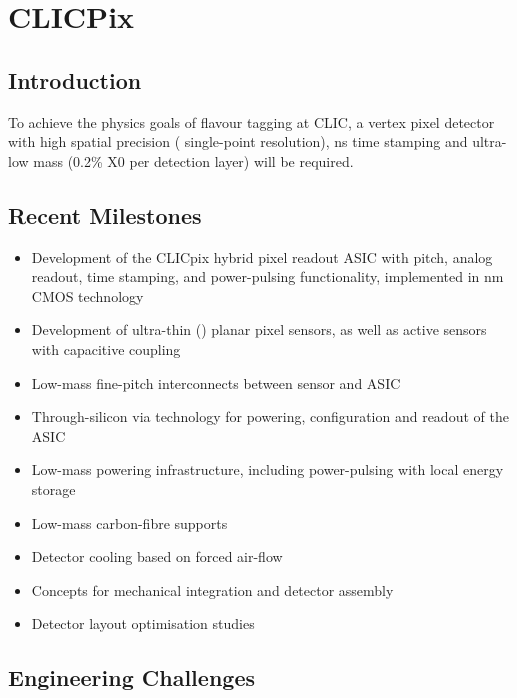 \section{CLICPix}

\subsection{Introduction}
To achieve the physics goals of flavour tagging at CLIC, a vertex pixel detector with high spatial precision (\unit[3]{\micron} single-point resolution), \unit[10]{ns} time stamping and ultra- low mass (0.2\% X0 per detection layer) will be required.

\subsection{Recent Milestones}
\begin{itemize}
\item Development of the CLICpix hybrid pixel readout ASIC with \unit[25]{\micron} pitch, analog readout, time stamping, and power-pulsing functionality, implemented in \unit[65]{nm} CMOS technology
\item Development of ultra-thin (\unit[50]{\micron}) planar pixel sensors, as well as active sensors with capacitive coupling
\item Low-mass fine-pitch interconnects between sensor and ASIC
\item Through-silicon via technology for powering, configuration and readout of the ASIC
\item Low-mass powering infrastructure, including power-pulsing with local energy storage
\item Low-mass carbon-fibre supports
\item Detector cooling based on forced air-flow
\item Concepts for mechanical integration and detector assembly
\item Detector layout optimisation studies
\end{itemize}

\subsection{Engineering Challenges}
